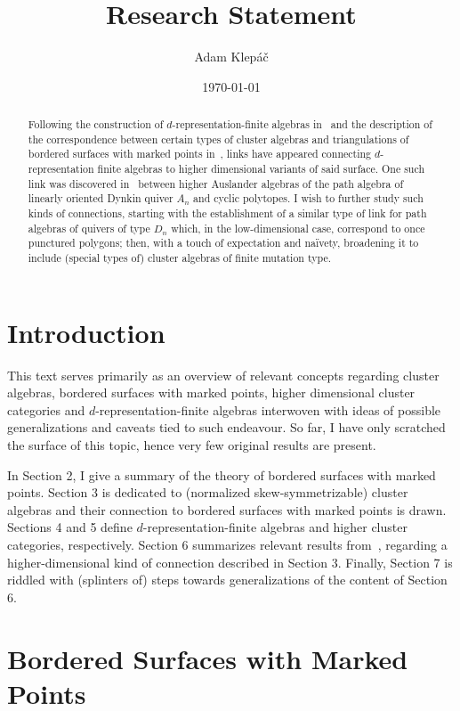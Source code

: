 \documentclass[a4paper,oneside,svgnames,draft]{amsart}
\title{Research Statement}
\author{Adam Klepáč}
\date{\today}
\theoremstyle{plain}
\theoremstyle{definition}
\begin{document}
 \maketitle
 \begin{abstract}
  Following the construction of $d$-representation-finite algebras
  in~\cite{iyama} and the description of the correspondence between certain
  types of cluster algebras and triangulations of bordered surfaces with marked
  points in~\cite{fst}, links have appeared connecting $d$-representation finite
  algebras to higher dimensional variants of said surface. One such link was
  discovered in~\cite{ot} between higher Auslander algebras of the path algebra
  of linearly oriented Dynkin quiver $A_n$ and cyclic polytopes. I wish to
  further study such kinds of connections, starting with the establishment of a
  similar type of link for path algebras of quivers of type $D_n$ which, in the
  low-dimensional case, correspond to once punctured polygons; then, with a
  touch of expectation and naïvety, broadening it to include (special types of)
  cluster algebras of finite mutation type.
 \end{abstract}

 \section{Introduction}
 \label{sec:introduction}

 This text serves primarily as an overview of relevant concepts regarding
 cluster algebras, bordered surfaces with marked points, higher dimensional
 cluster categories and $d$-representation-finite algebras interwoven with ideas
 of possible generalizations and caveats tied to such endeavour. So far, I have
 only scratched the surface of this topic, hence very few original results are
 present.

 In Section 2, I give a summary of the theory of bordered surfaces with marked
 points. Section 3 is dedicated to (normalized skew-symmetrizable) cluster
 algebras and their connection to bordered surfaces with marked points is drawn.
 Sections 4 and 5 define $d$-representation-finite algebras and higher cluster
 categories, respectively. Section 6 summarizes relevant results
 from~\cite{ot}, regarding a higher-dimensional kind of connection described in
 Section 3. Finally, Section 7 is riddled with (splinters of) steps towards
 generalizations of the content of Section 6.

 \section{Bordered Surfaces with Marked Points}
 \label{sec:bordered-surfaces-with-marked-points}
\end{document}

